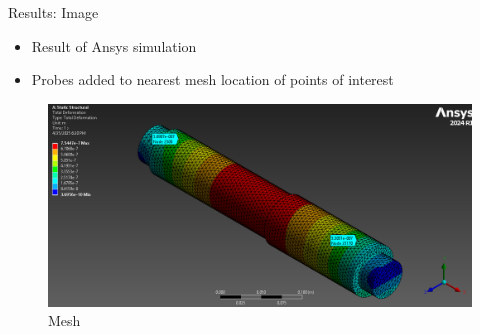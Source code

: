 \documentclass[11pt]{beamer}
\begin{document}
    \begin{frame}{Results: Image}
       \begin{itemize} 
            \item Result of Ansys simulation 
            \item Probes added to nearest mesh location of points of interest
        \end{itemize}

        \vspace{10pt}
        \begin{figure}[H]
            \centering
            \vspace{-17pt}
            \includegraphics[scale=0.215]{figs/deflection_iso.png}
            \caption{Mesh}
        \end{figure}
    \end{frame}
\end{document}

